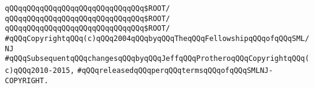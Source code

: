 \verb|qQQqqQQqqQQqqQQqqQQqqQQqqQQqqQQq$ROOT/|\newline
\newline
\verb|qQQqqQQqqQQqqQQqqQQqqQQqqQQqqQQq$ROOT/|\newline
\verb|qQQqqQQqqQQqqQQqqQQqqQQqqQQqqQQq$ROOT/|\newline
\newline
\newline
\verb|#qQQqCopyrightqQQq(c)qQQq2004qQQqbyqQQqTheqQQqFellowshipqQQqofqQQqSML/NJ|\newline
\verb|#qQQqSubsequentqQQqchangesqQQqbyqQQqJeffqQQqProtheroqQQqCopyrightqQQq(c)qQQq2010-2015,|\newline
\verb|#qQQqreleasedqQQqperqQQqtermsqQQqofqQQqSMLNJ-COPYRIGHT.|\newline

